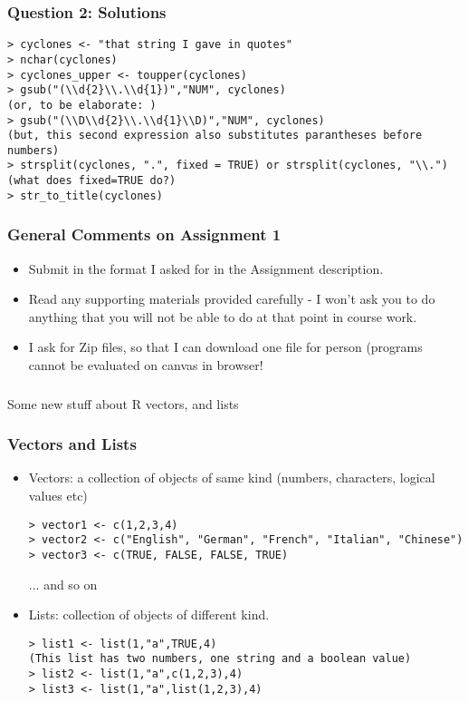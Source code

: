 \documentclass{beamer}
\begin{document}
\begin{frame}[fragile]
\frametitle{Question 2: Solutions}
\scriptsize
\begin{verbatim}
> cyclones <- "that string I gave in quotes"
> nchar(cyclones)
> cyclones_upper <- toupper(cyclones)
> gsub("(\\d{2}\\.\\d{1})","NUM", cyclones) 
(or, to be elaborate: )
> gsub("(\\D\\d{2}\\.\\d{1}\\D)","NUM", cyclones)
(but, this second expression also substitutes parantheses before numbers)
> strsplit(cyclones, ".", fixed = TRUE) or strsplit(cyclones, "\\.")
(what does fixed=TRUE do?)
> str_to_title(cyclones)
\end{verbatim}
\end{frame}

\begin{frame}
\frametitle{General Comments on Assignment 1}
\begin{itemize}
\item Submit in the format I asked for in the Assignment description.
\item Read any supporting materials provided carefully - I won't ask you to do anything that you will not be able to do at that point in course work.
\item I ask for Zip files, so that I can download one file for person (programs cannot be evaluated on canvas in browser!
\end{itemize}
\end{frame}

\begin{frame}
\frametitle{}
\Large Some new stuff about R vectors, and lists
\end{frame}

\begin{frame}[fragile]
\frametitle{Vectors and Lists}
\begin{itemize}
\item Vectors: a collection of objects of same kind (numbers, characters, logical values etc)
\scriptsize
\begin{verbatim}
> vector1 <- c(1,2,3,4)
> vector2 <- c("English", "German", "French", "Italian", "Chinese")
> vector3 <- c(TRUE, FALSE, FALSE, TRUE)
\end{verbatim} \small
... and so on
\item Lists: collection of objects of different kind. \scriptsize
\begin{verbatim}
> list1 <- list(1,"a",TRUE,4)
(This list has two numbers, one string and a boolean value)
> list2 <- list(1,"a",c(1,2,3),4)
> list3 <- list(1,"a",list(1,2,3),4)
\end{verbatim}
\end{itemize}
\end{frame}
\end{document}

